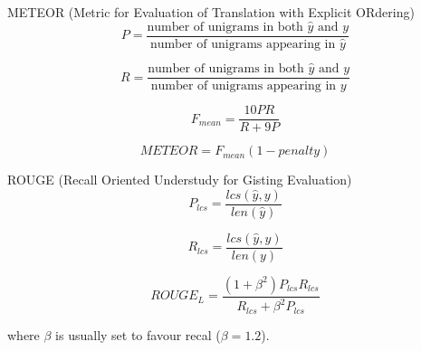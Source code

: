 \documentclass[10pt]{beamer}
\begin{document}
\begin{frame}{METEOR (Metric for Evaluation of Translation with Explicit ORdering) \cite{Lavie}}
\begin{equation}
P = \frac{\text{number of } \text{unigrams in both } \hat{y} \text{ and } y}{\text{number of } \text{unigrams appearing in } \hat{y}}
\end{equation}    


\begin{equation}
R = \frac{\text{number of } \text{unigrams in both } \hat{y} \text{ and } y}{\text{number of } \text{unigrams appearing in } y}
\end{equation}    


\begin{equation}
F_{mean} = \frac{10 P R}{R + 9P}
\end{equation}

\begin{equation}
METEOR = F_{mean} (1 - penalty)
\end{equation}
\end{frame}

\begin{frame}{ROUGE (Recall Oriented Understudy for Gisting Evaluation) \cite{Lin}}
\begin{equation}
P_{lcs} = \frac{lcs(\hat{y}, y)}{len(\hat{y})}
\end{equation}    


\begin{equation}
R_{lcs} = \frac{lcs(\hat{y}, y)}{len(y)}
\end{equation}

\begin{equation}
ROUGE_L = \frac{(1 + \beta^2) P_{lcs} R_{lcs}}{R_{lcs} + \beta^{2}P_{lcs}}
\end{equation}

where $\beta$ is usually set to favour recal ($\beta = 1.2$).
\end{frame}
\end{document}

